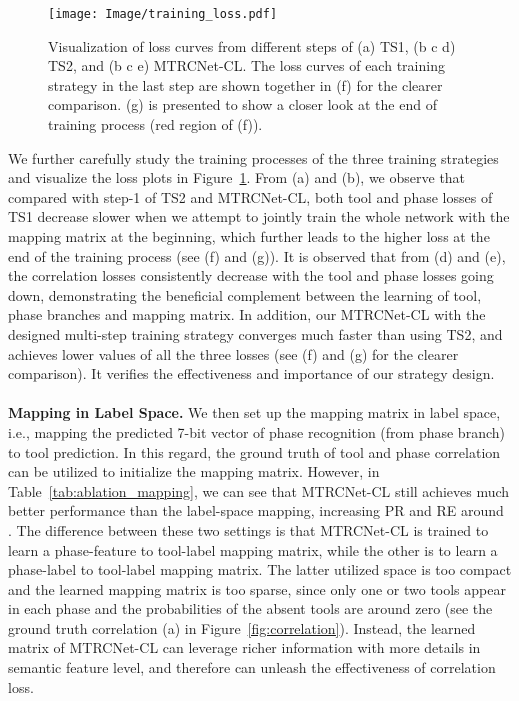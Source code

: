 \documentclass{elsarticle}
\begin{document}
\begin{figure}[t]
	\color{blue}
	\centering
	\texttt{[image: Image/training\_loss.pdf]}
	\caption{
		Visualization of loss curves from different steps of (a) TS1, (b c d) TS2, and (b c e) MTRCNet-CL. The loss curves of each training strategy in the last step are shown together in (f) for the clearer comparison. (g) is presented to show a closer look at the end of training process (red region of (f)). }
	\label{fig:loss}
\end{figure}
We further carefully study the training processes of the three training strategies and visualize the loss plots in Figure~\ref{fig:loss}.
From (a) and (b), we observe that compared with step-1 of TS2 and MTRCNet-CL, both tool and phase losses of TS1 decrease slower when we attempt to jointly train the whole network with the mapping matrix at the beginning, which further leads to the higher loss at the end of the training process (see (f) and (g)). 
It is observed that from (d) and (e), the correlation losses consistently decrease with the tool and phase losses going down, demonstrating the beneficial complement between the learning of tool, phase branches and mapping matrix. 
In addition, our MTRCNet-CL with the designed multi-step training strategy converges much faster than using TS2, and achieves lower values of all the three losses (see (f) and (g) for the clearer comparison). It verifies the effectiveness and importance of our strategy design.
\\
\\
\textbf{Mapping in Label Space.}
We then set up the mapping matrix in label space, i.e., mapping the predicted 7-bit vector of phase recognition (from phase branch) to tool prediction.
In this regard, the ground truth of tool and phase correlation can be utilized to initialize the mapping matrix.
However, in Table~\ref{tab:ablation_mapping}, we can see that MTRCNet-CL still achieves much better performance than the label-space mapping, increasing PR and RE around .
The difference between these two settings is that MTRCNet-CL is trained to learn a phase-feature to tool-label mapping matrix, while the other is to learn a phase-label to tool-label mapping matrix.
The latter utilized space is too compact and the learned mapping matrix is too sparse, since only one or two tools appear in each phase and the probabilities of the absent tools are around zero (see the ground truth correlation (a) in Figure~\ref{fig:correlation}).
Instead, the learned matrix of MTRCNet-CL can leverage richer information with more details in semantic feature level, and therefore can unleash the effectiveness of correlation loss.
\end{document}

